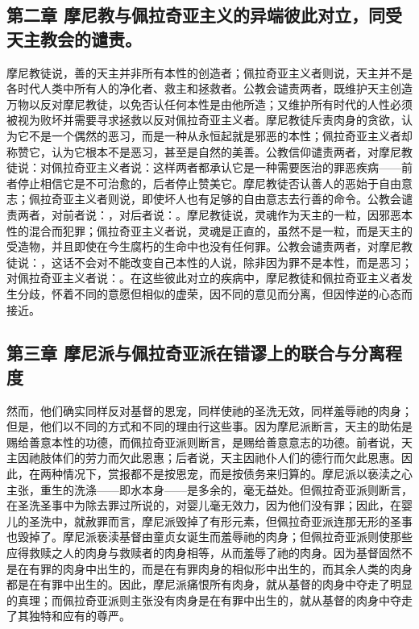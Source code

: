 
\subsection{第二章 摩尼教与佩拉奇亚主义的异端彼此对立，同受天主教会的谴责。}

摩尼教徒说，善的天主并非所有本性的创造者；佩拉奇亚主义者则说，天主并不是各时代人类中所有人的净化者、救主和拯救者。公教会谴责两者，既维护天主创造万物以反对摩尼教徒，以免否认任何本性是由他所造；又维护所有时代的人性必须被视为败坏并需要寻求拯救以反对佩拉奇亚主义者。摩尼教徒斥责肉身的贪欲，认为它不是一个偶然的恶习，而是一种从永恒起就是邪恶的本性；佩拉奇亚主义者却称赞它，认为它根本不是恶习，甚至是自然的美善。公教信仰谴责两者，对摩尼教徒说：对佩拉奇亚主义者说：这样两者都承认它是一种需要医治的罪恶疾病——前者停止相信它是不可治愈的，后者停止赞美它。摩尼教徒否认善人的恶始于自由意志；佩拉奇亚主义者则说，即使坏人也有足够的自由意志去行善的命令。公教会谴责两者，对前者说：，对后者说：。摩尼教徒说，灵魂作为天主的一粒，因邪恶本性的混合而犯罪；佩拉奇亚主义者说，灵魂是正直的，虽然不是一粒，而是天主的受造物，并且即使在今生腐朽的生命中也没有任何罪。公教会谴责两者，对摩尼教徒说：，这话不会对不能改变自己本性的人说，除非因为罪不是本性，而是恶习；对佩拉奇亚主义者说：。在这些彼此对立的疾病中，摩尼教徒和佩拉奇亚主义者发生分歧，怀着不同的意愿但相似的虚荣，因不同的意见而分离，但因悖逆的心态而接近。\par


\subsection{第三章 摩尼派与佩拉奇亚派在错谬上的联合与分离程度}

然而，他们确实同样反对基督的恩宠，同样使祂的圣洗无效，同样羞辱祂的肉身；但是，他们以不同的方式和不同的理由行这些事。因为摩尼派断言，天主的助佑是赐给善意本性的功德，而佩拉奇亚派则断言，是赐给善意意志的功德。前者说，天主因祂肢体们的劳力而欠此恩惠；后者说，天主因祂仆人们的德行而欠此恩惠。因此，在两种情况下，赏报都不是按恩宠，而是按债务来归算的。摩尼派以亵渎之心主张，重生的洗涤——即水本身——是多余的，毫无益处。但佩拉奇亚派则断言，在圣洗圣事中为除去罪过所说的，对婴儿毫无效力，因为他们没有罪；因此，在婴儿的圣洗中，就赦罪而言，摩尼派毁掉了有形元素，但佩拉奇亚派连那无形的圣事也毁掉了。摩尼派亵渎基督由童贞女诞生而羞辱祂的肉身；但佩拉奇亚派则使那些应得救赎之人的肉身与救赎者的肉身相等，从而羞辱了祂的肉身。因为基督固然不是在有罪的肉身中出生的，而是在有罪肉身的相似形中出生的，而其余人类的肉身都是在有罪中出生的。因此，摩尼派痛恨所有肉身，就从基督的肉身中夺走了明显的真理；而佩拉奇亚派则主张没有肉身是在有罪中出生的，就从基督的肉身中夺走了其独特和应有的尊严。\par

